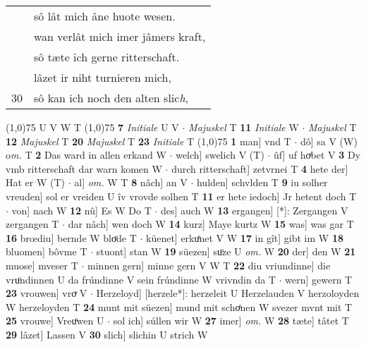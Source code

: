 \documentclass[8pt,a4paper,notitlepage]{article}
\begin{document}
\begin{table}[ht]
\begin{minipage}[t]{0.5\linewidth}
\begin{tabular}{rl}
 & sô lât mich âne huote wesen.\\ 
 & wan verlât mich imer jâmers kraft,\\ 
 & sô tæte ich gerne ritterschaft.\\ 
 & lâzet ir niht turnieren mich,\\ 
30 & sô kan ich noch den alten slic\textit{h},\\ 
\end{tabular}
\scriptsize
\line(1,0){75} \newline
U V W T \newline
\line(1,0){75} \newline
\textbf{7} \textit{Initiale} U V   $\cdot$ \textit{Majuskel} T  \textbf{11} \textit{Initiale} W   $\cdot$ \textit{Majuskel} T  \textbf{12} \textit{Majuskel} T  \textbf{20} \textit{Majuskel} T  \textbf{23} \textit{Initiale} T  \newline
\line(1,0){75} \newline
\textbf{1} man] vnd T  $\cdot$ dô] sa V (W) o\textit{m. } T \textbf{2} Das ward in allen erkand W  $\cdot$ welch] swelich V (T)  $\cdot$ ûf] uf hoͮbet V \textbf{3} Dy vmb ritterschaft dar warn komen W  $\cdot$ durch ritterschaft] zetvrnei T \textbf{4} hete der] Hat er W (T)  $\cdot$ al] \textit{om.} W T \textbf{8} nâch] an V  $\cdot$ hulden] schvlden T \textbf{9} iu solher vreuden] sol er vreiden U îv vrovde solhen T \textbf{11} er hete iedoch] Jr hetent doch T  $\cdot$ von] nach W \textbf{12} nû] Es W Do T  $\cdot$ des] auch W \textbf{13} ergangen] [*]: Zergangen V zergangen T  $\cdot$ dar nâch] wen doch W \textbf{14} kurz] Maye kurtz W \textbf{15} was] was gar T \textbf{16} brœdiu] bernde W bloͤde T  $\cdot$ küenet] erkuͤnet V W \textbf{17} in gît] gibt im W \textbf{18} bluomen] bôvme T  $\cdot$ stuont] stan W \textbf{19} süezen] suͦze U \textit{om.} W \textbf{20} der] den W \textbf{21} muose] mveser T  $\cdot$ minnen gern] minne gern V W T \textbf{22} diu vriundinne] die vruͦndinnen U da frúndinne V sein frúndinne W vrivndin da T  $\cdot$ wern] gewern T \textbf{23} vrouwen] vroͮ V  $\cdot$ Herzeloyd] [herzele*]: herzeleit U Herzelauden V herzoloyden W herzeloyden T \textbf{24} munt mit süezen] mund mit schoͤnen W svezer mvnt mit T \textbf{25} vrouwe] Vreuͦwen U  $\cdot$ sol ich] súllen wir W \textbf{27} imer] \textit{om.} W \textbf{28} tæte] tâtet T \textbf{29} lâzet] Lassen V \textbf{30} slich] slichin U strich W \newline
\end{minipage}
\end{table}
\end{document}
